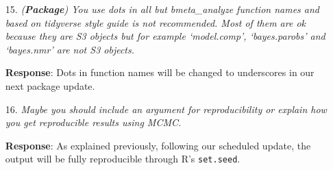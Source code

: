 \documentclass[11pt]{article}
\newcommand{\1}{{\bf{{1}}}}
\begin{document}
\begin{itemize}
\begin{verbatim}
// [[Rcpp::export]]
arma::mat test(int &n) {
    double df = 10.0;
    return arma::chi2rnd(df, n, n);
}
\end{verbatim}

On my Mac,
\begin{verbatim}
library(Rcpp)
library(RcppArmadillo)
sourceCpp("test.cpp")
set.seed(1111)
test(3)
\end{verbatim}
yields
\begin{verbatim}
           [,1]     [,2]      [,3]
[1,]   5.887224 17.05700 13.624775
[2,]  17.508067 13.30482  8.697143
[3,]   8.741382 12.24704 13.127976
\end{verbatim}
whereas Debian yields
\begin{verbatim}
         [,1]      [,2]      [,3]
[1,] 8.799888  2.989588 10.063611
[2,] 6.388290 17.797957 10.254374
[3,] 6.100068 10.639533  7.728846
\end{verbatim}
We have not been able to get to the bottom of this issue and how Armadillo is getting its seed for other samplers, but for now, we have coded the Wishart sampler ourselves and verified that our MCMC results are reproducible across all three major operating systems (Windows, macOS, and Debian) with R's \texttt{set.seed}. The modified package will be submitted to CRAN upon our revised manuscript's resubmission.


\item[15.] {\it (\textbf{Package}) You use dots in all but bmeta\_analyze function names and based on tidyverse style guide is not recommended. Most of them are ok because they are S3 objects but for example `model.comp', `bayes.parobs' and `bayes.nmr' are not S3 objects.}

\medskip
\noindent
{\bf Response}: Dots in function names will be changed to underscores in our next package update.


\item[16.] {\it Maybe you should include an argument for reproducibility or explain how you get reproducible results using MCMC.}

\medskip
\noindent
{\bf Response}: As explained previously, following our scheduled update, the output will be fully reproducible through R's \texttt{set.seed}.
\end{itemize}




\end{document}
